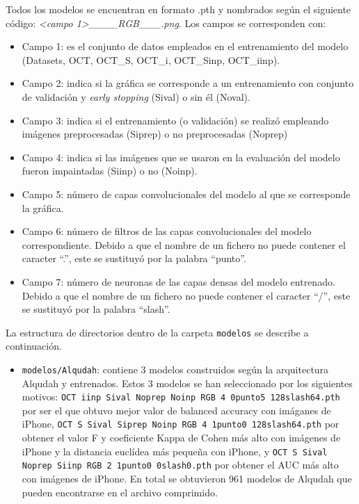 \begin{itemize}
    Todos los modelos se encuentran en formato .pth y nombrados según el siguiente código: \textit{<campo 1>\_<campo 2>\_<campo 3>\_<campo 4>\_RGB\_<campo 5>\_<campo 6>\_<campo 7>.png}. Los campos se corresponden con:
    \begin{itemize}
        \item Campo 1: es el conjunto de datos empleados en el entrenamiento del modelo (Datasets, OCT, OCT\_S, OCT\_i, OCT\_Sinp, OCT\_iinp).
        \item Campo 2: indica si la gráfica se corresponde a un entrenamiento con conjunto de validación y \textit{early stopping} (Sival) o sin él (Noval).
        \item Campo 3: indica si el entrenamiento (o validación) se realizó empleando imágenes preprocesadas (Siprep) o no preprocesadas (Noprep)
        \item Campo 4: indica si las imágenes que se usaron en la evaluación del modelo fueron impaintadas (Siinp) o no (Noinp). 
        \item Campo 5: número de capas convolucionales del modelo al que se corresponde la gráfica.
        \item Campo 6: número de filtros de las capas convolucionales del modelo correspondiente. Debido a que el nombre de un fichero no puede contener el caracter ``.'', este se sustituyó por la palabra ``punto''. 
        \item Campo 7: número de neuronas de las capas densas del modelo entrenado. Debido a que el nombre de un fichero no puede contener el caracter ``/'', este se sustituyó por la palabra ``slash''.
    \end{itemize}
    La estructura de directorios dentro de la carpeta \texttt{modelos} se describe a continuación.
    \begin{itemize}
        \item \texttt{modelos/Alqudah}: contiene 3 modelos construidos según la arquitectura Alqudah y entrenados. Estos 3 modelos se han seleccionado por los siguientes motivos: \texttt{OCT iinp Sival Noprep Noinp RGB 4 0punto5 128slash64.pth} por ser el que obtuvo mejor valor de balanced accuracy con imáganes de iPhone, \texttt{OCT S Sival Siprep Noinp RGB 4 1punto0 128slash64.pth} por obtener el valor F y coeficiente Kappa de Cohen más alto con imágenes de iPhone y la distancia euclídea más pequeña con iPhone, y \texttt{OCT S Sival Noprep Siinp RGB 2 1punto0 0slash0.pth} por obtener el AUC más alto con imágenes de iPhone. En total se obtuvieron 961 modelos de Alqudah que pueden encontrarse en el archivo comprimido.

\end{itemize}
\end{itemize}
